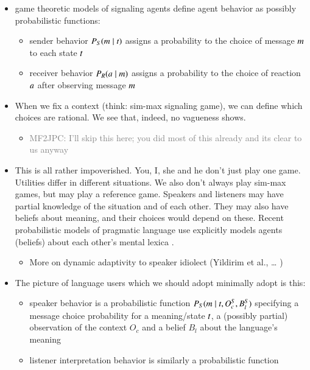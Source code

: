 \documentclass[fleqn,reqno,10pt]{article}
\begin{document}
\begin{itemize}
\item game theoretic models of signaling agents define agent behavior as possibly probabilistic
  functions:
  \begin{itemize}
  \item sender behavior $P_S(m \mid t)$ assigns a probability to the choice of message
    $m$ to each state $t$
  \item receiver behavior $P_R(a \mid m)$ assigns a probability to the choice of
    reaction $a$ after observing message $m$
  \end{itemize}
\item When we fix a context (think: sim-max signaling game), we can define which choices are
  rational. We see that, indeed, no vagueness shows.
  \begin{itemize}
  \item \textcolor{gray}{MF2JPC: I'll skip this here; you did most of this already and its
      clear to us anyway}
  \end{itemize}
\item This is all rather impoverished. You, I, she and he don't just play one game. Utilities
  differ in different situations. We also don't always play sim-max games, but may play a
  reference game. Speakers and listeners may have partial knowledge of the situation and of
  each other. They may also have beliefs about meaning, and their choices would depend on
  these. Recent probabilistic models of pragmatic language use explicitly models agents
  (beliefs) about each other's mental lexica
  \citep{BergenLevy2012:Thats-what-she-,BergenLevy2014:Pragmatic-Reaso,PottsLassiter2016:Embedded-implic}.
  \begin{itemize}
  \item More on dynamic adaptivity to speaker idiolect (Yildirim et al., \dots
    \citet{Davidson_1986:Derangement})
  \end{itemize}
\item The picture of language users which we should adopt minimally adopt is this:
  \begin{itemize}
  \item speaker behavior is a probabilistic function $P_S(m \mid t, O^S_c, B^S_l)$
    specifying a message choice probability for a meaning/state $t$, a (possibly partial)
    observation of the context $O_c$ and a belief $B_l$ about the language's meaning
  \item listener interpretation behavior is similarly a probabilistic function

\end{itemize}
\end{itemize}
\end{document}
